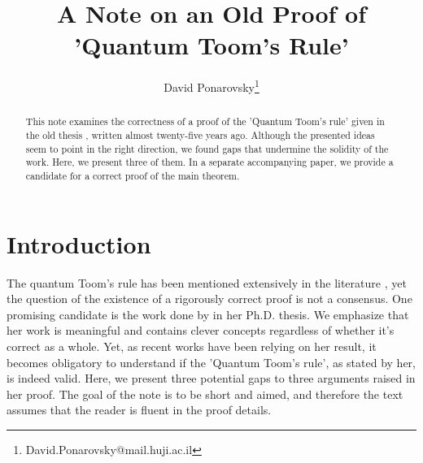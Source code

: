 \documentclass[manuscript,screen,review]{acmart}
\begin{document}

\title{ A Note on an Old Proof of 'Quantum Toom's Rule' }
\author{David Ponarovsky\footnote{David.Ponarovsky@mail.huji.ac.il}}
\maketitle

\newcommand*{\xb}{\mathbf{x}}

\ifdefined\SWEEPHEA
\else 
  \newcommand*{\SWEEPHEA}{}
\newcommand{\History}[1]{H_{#1}}
  \newcommand{\Time}[1]{T(#1)}
  \newcommand{\Excuse}[1]{\mathbf{Excuse}(#1)}
  \newcommand{\Excusei}[1]{\mathbf{Excuse}_{i}(#1)}
  \newcommand{\Size}[1]{\mathbf{Size}(#1)}
  \newcommand{\Span}[1]{\mathbf{Span}(#1)}
  \newcommand{\pre}[1]{\text{pre}(#1)}
  \newcommand{\poli}[1]{\text{pole}_{i}(#1)}
  \newcommand{\prei}[1]{\text{pre}_{i}(#1)}
  \newcommand{\predd}[1]{\text{pre}_{d+1}(#1)}
  \newcommand{\rotf}[2]{\theta_{#1 ,#2}}
  \newcommand*{\rotfs}{\rotf{v}{S^{\prime}}}
  \newcommand{\rotfv}[2]{\mathbf{\rotf{#1}{#2} }}
  \newcommand*{\rotfvs}{\mathbf{\rotfs{} }}
  \newcommand{\F}{\mathbb F_2}
  \newcommand{\supp}{\operatorname{supp}}
  \newcommand{\bd}{\partial}
  \newcommand{\red}{\operatorname{red}}
  \newcommand{\Star}{\operatorname{Star}}
  \newcommand{\Cx}{\operatorname{CNOT}}
\fi



\begin{abstract}
This note examines the correctness of a proof of the 'Quantum Toom's rule' given in the old thesis \cite{Ahn2004}, written almost twenty-five years ago. Although the presented ideas seem to point in the right direction, we found gaps that undermine the solidity of the work. Here, we present three of them. In a separate accompanying paper, we provide a candidate for a correct proof of the main theorem.
\end{abstract}
\section{Introduction} 
The quantum Toom's rule has been mentioned extensively in the literature \cite{Dennis_2002}, yet the question of the existence of a rigorously correct proof is not a consensus. One promising candidate is the work done by \cite{Ahn2004} in her Ph.D. thesis. We emphasize that her work is meaningful and contains clever concepts regardless of whether it's correct as a whole. Yet, as recent works have been relying on her result, it becomes obligatory to understand if the 'Quantum Toom's rule', as stated by her, is indeed valid. Here, we present three potential gaps to three arguments raised in her proof. The goal of the note is to be short and aimed, and therefore the text assumes that the reader is fluent in the proof details.
\end{document}
